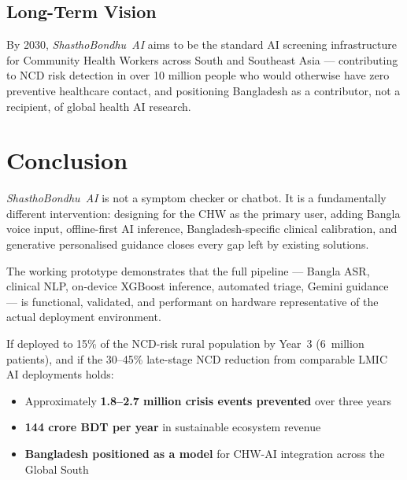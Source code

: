 \documentclass[12pt, a4paper]{article}
\newcommand{\sba}{\textit{ShasthoBondhu~AI}}
\begin{document}
\subsection{Long-Term Vision}

\begin{infobox}[2030 Vision]
\small
By 2030, \sba{} aims to be the standard AI screening infrastructure for
Community Health Workers across South and Southeast Asia — contributing to
NCD risk detection in over 10 million people who would otherwise have zero
preventive healthcare contact, and positioning Bangladesh as a contributor,
not a recipient, of global health AI research.
\end{infobox}

\section{Conclusion}

\sba{} is not a symptom checker or chatbot. It is a fundamentally different
intervention: designing for the CHW as the primary user, adding Bangla voice
input, offline-first AI inference, Bangladesh-specific clinical calibration, and
generative personalised guidance closes every gap left by existing solutions.

The working prototype demonstrates that the full pipeline — Bangla ASR, clinical
NLP, on-device XGBoost inference, automated triage, Gemini guidance — is
functional, validated, and performant on hardware representative of the actual
deployment environment.

\begin{researchbox}
\small
If deployed to 15\% of the NCD-risk rural population by Year~3 (6~million
patients), and if the 30--45\% late-stage NCD reduction from comparable
LMIC AI deployments holds:
\begin{itemize}
  \item Approximately \textbf{1.8--2.7 million crisis events prevented} over three years
  \item \textbf{144 crore BDT per year} in sustainable ecosystem revenue
  \item \textbf{Bangladesh positioned as a model} for CHW-AI integration across the Global South
\end{itemize}
\end{researchbox}
\end{document}
